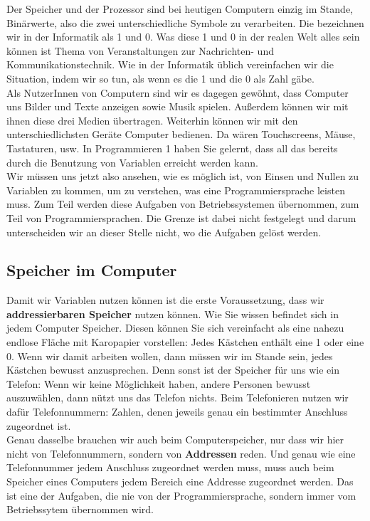 Der Speicher und der Prozessor sind bei heutigen Computern einzig im Stande, Binärwerte, also die zwei unterschiedliche Symbole zu verarbeiten. Die bezeichnen wir in der Informatik als 1 und 0. Was diese 1 und 0 in der realen Welt alles sein können ist Thema von Veranstaltungen zur Nachrichten- und Kommunikationstechnik. Wie in der Informatik üblich vereinfachen wir die Situation, indem wir so tun, als wenn es die 1 und die 0 als Zahl gäbe.\\

Als NutzerInnen von Computern sind wir es dagegen gewöhnt, dass Computer uns Bilder und Texte anzeigen sowie Musik spielen. Außerdem können wir mit ihnen diese drei Medien übertragen. Weiterhin können wir mit den unterschiedlichsten Geräte Computer bedienen. Da wären Touchscreens, Mäuse, Tastaturen, usw. In Programmieren 1 haben Sie gelernt, dass all das bereits durch die Benutzung von Variablen erreicht werden kann.\\

Wir müssen uns jetzt also ansehen, wie es möglich ist, von Einsen und Nullen zu Variablen zu kommen, um zu verstehen, was eine Programmiersprache leisten muss. Zum Teil werden diese Aufgaben von Betriebssystemen übernommen, zum Teil von Programmiersprachen. Die Grenze ist dabei nicht festgelegt und darum unterscheiden wir an dieser Stelle nicht, wo die Aufgaben gelöst werden.

\subsection{Speicher im Computer}

Damit wir Variablen nutzen können ist die erste Voraussetzung, dass wir \textbf{addressierbaren Speicher} nutzen können. Wie Sie wissen befindet sich in jedem Computer Speicher. Diesen können Sie sich vereinfacht als eine nahezu endlose Fläche mit Karopapier vorstellen: Jedes Kästchen enthält eine 1 oder eine 0. Wenn wir damit arbeiten wollen, dann müssen wir im Stande sein, jedes Kästchen bewusst anzusprechen. Denn sonst ist der Speicher für uns wie ein Telefon: Wenn wir keine Möglichkeit haben, andere Personen bewusst auszuwählen, dann nützt uns das Telefon nichts. Beim Telefonieren nutzen wir dafür Telefonnummern: Zahlen, denen jeweils genau ein bestimmter Anschluss zugeordnet ist.\\

Genau dasselbe brauchen wir auch beim Computerspeicher, nur dass wir hier nicht von Telefonnummern, sondern von \textbf{Addressen} reden. Und genau wie eine Telefonnummer jedem Anschluss zugeordnet werden muss, muss auch beim Speicher eines Computers jedem Bereich eine Addresse zugeordnet werden. Das ist eine der Aufgaben, die nie von der Programmiersprache, sondern immer vom Betriebssytem übernommen wird.\\

